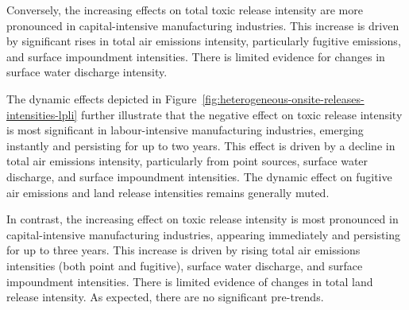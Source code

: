 \documentclass[12pt, english]{article}
\begin{document}
    Conversely, the increasing effects on total toxic release intensity are more pronounced in capital-intensive manufacturing industries. This increase is driven by significant rises in total air emissions intensity, particularly fugitive emissions, and surface impoundment intensities. There is limited evidence for changes in surface water discharge intensity.

    The dynamic effects depicted in Figure~\ref{fig:heterogeneous-onsite-releases-intensities-lpli} further illustrate that the negative effect on toxic release intensity is most significant in labour-intensive manufacturing industries, emerging instantly and persisting for up to two years. This effect is driven by a decline in total air emissions intensity, particularly from point sources, surface water discharge, and surface impoundment intensities. The dynamic effect on fugitive air emissions and land release intensities remains generally muted.
    

    In contrast, the increasing effect on toxic release intensity is most pronounced in capital-intensive manufacturing industries, appearing immediately and persisting for up to three years. This increase is driven by rising total air emissions intensities (both point and fugitive), surface water discharge, and surface impoundment intensities. There is limited evidence of changes in total land release intensity. As expected, there are no significant pre-trends.
\end{document}
